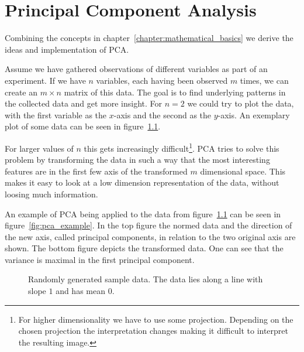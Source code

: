 \chapter{Principal Component Analysis}
\label{chapter:principal_component_analysis}

Combining the concepts in chapter~\ref{chapter:mathematical_basics} we derive the ideas and implementation of PCA.

Assume we have gathered observations of different variables as part of an experiment. If we have $n$ variables, each having been observed $m$ times, we can create an $m \times n$ matrix of this data. The goal is to find underlying patterns in the collected data and get more insight. For $n = 2$ we could try to plot the data, with the first variable as the $x$-axis and the second as the $y$-axis. An exemplary plot of some data can be seen in figure~\ref{fig:some_nice_data}.

For larger values of $n$ this gets increasingly difficult\footnote{For higher dimensionality we have to use some projection. Depending on the chosen projection the interpretation changes making it difficult to interpret the resulting image.}. PCA tries to solve this problem by transforming the data in such a way that the most interesting features are in the first few axis of the transformed $m$ dimensional space. This makes it easy to look at a low dimension representation of the data, without loosing much information.

An example of PCA being applied to the data from figure~\ref{fig:some_nice_data} can be seen in figure~\ref{fig:pca_example}. In the top figure the normed data and the direction of the new axis, called principal components, in relation to the two original axis are shown. The bottom figure depicts the transformed data. One can see that the variance is maximal in the first principal component.

\begin{figure}[h!]
	\centering
	
	\caption{Randomly generated sample data. The data lies along a line with slope $1$ and has mean $0$.}
	\label{fig:some_nice_data}
\end{figure}

